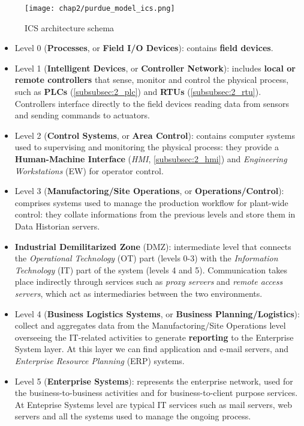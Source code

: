 \begin{figure}[ht]
	\centering
	\texttt{[image: chap2/purdue\_model\_ics.png]}
	\caption{ICS architecture schema}
	\label{fig:2_SCADA_schema}
\end{figure}

\begin{itemize}
	\item Level 0 (\textbf{Processes}, or \textbf{Field I/O Devices}): contains \textbf{field devices}.
	
	\item Level 1 (\textbf{Intelligent Devices}, or \textbf{Controller Network}): includes \textbf{local or remote controllers} that sense, monitor and control the physical process, such as \textbf{PLCs} (\ref{subsubsec:2_plc}) and \textbf{RTUs} (\ref{subsubsec:2_rtu}). Controllers interface directly to the field devices reading data from sensors and sending commands to actuators.
	
	\item Level 2 (\textbf{Control Systems}, or \textbf{Area Control}): contains computer systems used to supervising and monitoring the physical process: they provide a \textbf{Human-Machine Interface} (\textit{HMI}, \ref{subsubsec:2_hmi}) and \textit{Engineering Workstations} (EW) for operator control.
	
	\item Level 3 (\textbf{Manufactoring/Site Operations}, or \textbf{Operations/Control}): comprises systems used to manage the production workflow for plant-wide control: they collate informations from the previous levels and store them in Data Historian servers.
	
	\item \textbf{Industrial Demilitarized Zone} (DMZ): intermediate level that connects the \textit{Operational Technology} (OT) part (levels 0-3) with the \textit{Information Technology} (IT) part of the system (levels 4 and 5). Communication takes place indirectly through services such as \textit{proxy servers} and \textit{remote access servers}, which act as intermediaries between the two environments.
	
	\item Level 4 (\textbf{Business Logistics Systems}, or \textbf{Business Planning/Logistics}): collect and aggregates data from the Manufactoring/Site Operations level overseeing the IT-related activities to generate \textbf{reporting} to the Enterprise System layer. At this layer we can find application and e-mail servers, and \textit{Enterprise Resource Planning} (ERP) systems.
	
	\item Level 5 (\textbf{Enterprise Systems}): represents the enterprise network, used for the business-to-business activities and for business-to-client purpose services. At Enteprise Systems level are typical IT services such as mail servers, web servers and all the systems used to manage the ongoing process.
\end{itemize}

